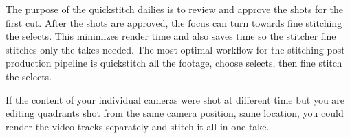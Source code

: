 \begin{fullwidth}
The purpose of the quickstitch dailies is to review and approve the shots for the first cut. After the shots are approved, the focus can turn towards fine stitching the selects. This minimizes render time and also saves time so the stitcher fine stitches only the takes needed. The most optimal workflow for the stitching post production pipeline is quickstitch all the footage, choose selects, then fine stitch the selects.

\tip If the content of your individual cameras were shot at different time but you are editing quadrants shot from the same camera position, same location, you could render the video tracks separately and stitch it all in one take.

\clearpage
\end{fullwidth}